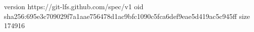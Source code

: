 version https://git-lfs.github.com/spec/v1
oid sha256:695e3c709029f7a1aae756478d1ac9bfc1090c5fca6def9eae5d419ac5c945ff
size 174916
